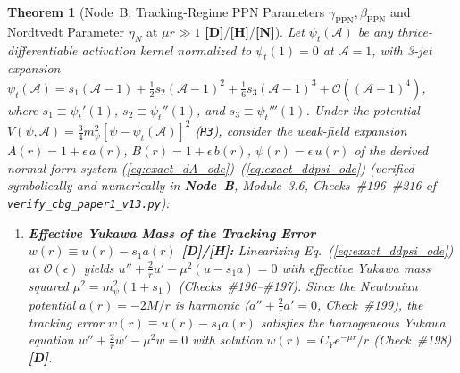 \documentclass[11pt,a4paper]{article}
\newcommand{\catD}{\textbf{\textcolor{blue!75!black}{[D]}}}
\newcommand{\catH}{\textbf{\textcolor{orange!85!black}{[H]}}}
\newcommand{\catN}{\textbf{\textcolor{teal!75!black}{[N]}}}
\newtheorem{theorem}{Theorem}[section]
\theoremstyle{definition}
\theoremstyle{remark}
\begin{document}
\begin{theorem}[Node~B: Tracking-Regime PPN Parameters $\gamma_{\text{PPN}}, \beta_{\text{PPN}}$ and Nordtvedt Parameter $\eta_N$ at $\mu r \gg 1$ \catD/\catH/\catN]
\label{thm:node_b_ppn_tracking}
Let $\psi_t(\mathcal{A})$ be any thrice-differentiable activation kernel normalized to $\psi_t(1) = 0$ at $\mathcal{A} = 1$, with 3-jet expansion $\psi_t(\mathcal{A}) = s_1(\mathcal{A} - 1) + \frac{1}{2}s_2(\mathcal{A} - 1)^2 + \frac{1}{6}s_3(\mathcal{A} - 1)^3 + \mathcal{O}((\mathcal{A} - 1)^4)$, where $s_1 \equiv \psi_t'(1)$, $s_2 \equiv \psi_t''(1)$, and $s_3 \equiv \psi_t'''(1)$. Under the potential $V(\psi, \mathcal{A}) = \frac{3}{4}m_\psi^2[\psi - \psi_t(\mathcal{A})]^2$ (\texttt{H3}), consider the weak-field expansion $A(r) = 1 + \epsilon\,a(r)$, $B(r) = 1 + \epsilon\,b(r)$, $\psi(r) = \epsilon\,u(r)$ of the derived normal-form system (\ref{eq:exact_dA_ode})--(\ref{eq:exact_ddpsi_ode}) (verified symbolically and numerically in \textbf{Node~B}, Module~3.6, Checks~\#196--\#216 of \texttt{verify\_cbg\_paper1\_v13.py}):
\begin{enumerate}
  \item[\textnormal{(i)}] \textbf{Effective Yukawa Mass of the Tracking Error $w(r) \equiv u(r) - s_1 a(r)$ \catD/\catH:} Linearizing Eq.~(\ref{eq:exact_ddpsi_ode}) at $\mathcal{O}(\epsilon)$ yields $u'' + \frac{2}{r}u' - \mu^2(u - s_1 a) = 0$ with effective Yukawa mass squared $\mu^2 = m_\psi^2(1 + s_1)$ (Checks~\#196--\#197). Since the Newtonian potential $a(r) = -2M/r$ is harmonic ($a'' + \frac{2}{r}a' = 0$, Check~\#199), the tracking error $w(r) \equiv u(r) - s_1 a(r)$ satisfies the homogeneous Yukawa equation $w'' + \frac{2}{r}w' - \mu^2 w = 0$ with solution $w(r) = C_Y e^{-\mu r}/r$ (Check~\#198) \catD.

\end{enumerate}
\end{theorem}
\end{document}
